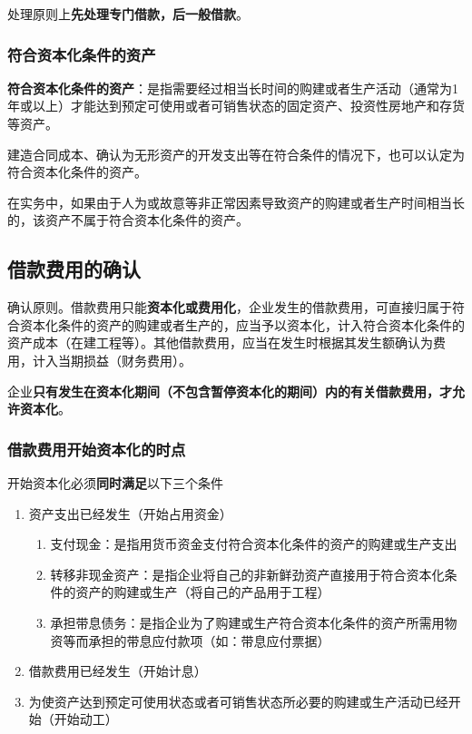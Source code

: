 \documentclass[UTF8,12pt]{ctexart}
\numberwithin{equation}{section} %
\numberwithin{figure}{section}
\numberwithin{table}{section}
\begin{document}
	处理原则上\textbf{先处理专门借款，后一般借款}。
	
	\subsubsection{符合资本化条件的资产}
	
	\textbf{符合资本化条件的资产}：是指需要经过相当长时间的购建或者生产活动（通常为1年或以上）才能达到预定可使用或者可销售状态的固定资产、投资性房地产和存货等资产。
	
	建造合同成本、确认为无形资产的开发支出等在符合条件的情况下，也可以认定为符合资本化条件的资产。
	
	在实务中，如果由于人为或故意等非正常因素导致资产的购建或者生产时间相当长的，该资产不属于符合资本化条件的资产。
	
	\subsection{借款费用的确认}
	确认原则。借款费用只能\textbf{资本化或费用化}，企业发生的借款费用，可直接归属于符合资本化条件的资产的购建或者生产的，应当予以资本化，计入符合资本化条件的资产成本（在建工程等）。其他借款费用，应当在发生时根据其发生额确认为费用，计入当期损益（财务费用）。
	
	企业\textbf{只有发生在资本化期间（不包含暂停资本化的期间）内的有关借款费用，才允许资本化}。
	
	\subsubsection{借款费用开始资本化的时点}
	开始资本化必须\textbf{同时满足}以下三个条件
	\begin{enumerate}
		\item 资产支出已经发生（开始占用资金）
		\begin{enumerate}
			\item 支付现金：是指用货币资金支付符合资本化条件的资产的购建或生产支出
			
			\item 转移非现金资产：是指企业将自己的非新鲜劲资产直接用于符合资本化条件的资产的购建或生产（将自己的产品用于工程）
			
			\item 承担带息债务：是指企业为了购建或生产符合资本化条件的资产所需用物资等而承担的带息应付款项（如：带息应付票据）
		\end{enumerate}
		
		\item 借款费用已经发生（开始计息）
		
		\item 为使资产达到预定可使用状态或者可销售状态所必要的购建或生产活动已经开始（开始动工）
	\end{enumerate}
	
\end{document}
